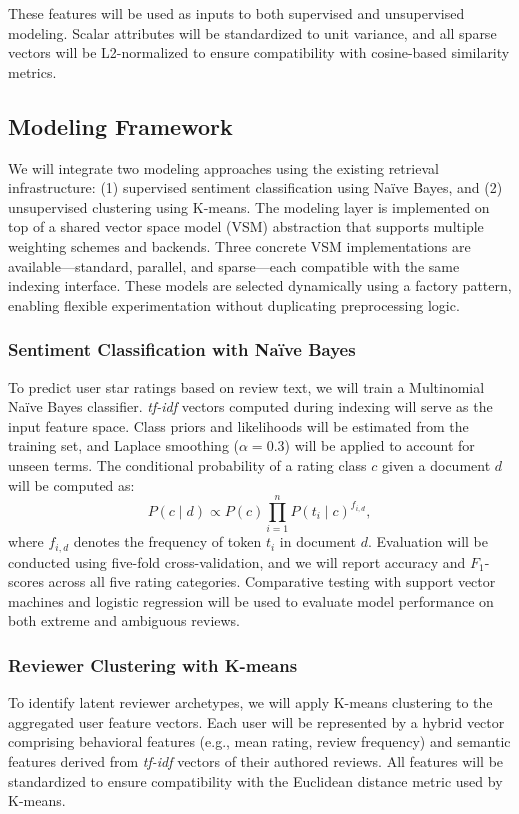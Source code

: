 These features will be used as inputs to both supervised and unsupervised modeling. Scalar attributes will be standardized to unit variance, and all sparse vectors will be L2-normalized to ensure compatibility with cosine-based similarity metrics.

\subsection{Modeling Framework}
We will integrate two modeling approaches using the existing retrieval infrastructure: (1) supervised sentiment classification using Na\"ive Bayes, and (2) unsupervised clustering using K-means. The modeling layer is implemented on top of a shared vector space model (VSM) abstraction that supports multiple weighting schemes and backends. Three concrete VSM implementations are available—standard, parallel, and sparse—each compatible with the same indexing interface. These models are selected dynamically using a factory pattern, enabling flexible experimentation without duplicating preprocessing logic.

\subsubsection{Sentiment Classification with Na\"ive Bayes}
To predict user star ratings based on review text, we will train a Multinomial Na\"ive Bayes classifier. \textit{tf-idf} vectors computed during indexing will serve as the input feature space. Class priors and likelihoods will be estimated from the training set, and Laplace smoothing (\( \alpha = 0.3 \)) will be applied to account for unseen terms. The conditional probability of a rating class \( c \) given a document \( d \) will be computed as:
\[
P(c \mid d) \propto P(c) \prod_{i=1}^{n} P(t_i \mid c)^{f_{i,d}},
\]
where \( f_{i,d} \) denotes the frequency of token \( t_i \) in document \( d \). Evaluation will be conducted using five-fold cross-validation, and we will report accuracy and \(F_1\)-scores across all five rating categories. Comparative testing with support vector machines and logistic regression will be used to evaluate model performance on both extreme and ambiguous reviews.

\subsubsection{Reviewer Clustering with K-means}
To identify latent reviewer archetypes, we will apply K-means clustering to the aggregated user feature vectors. Each user will be represented by a hybrid vector comprising behavioral features (e.g., mean rating, review frequency) and semantic features derived from \textit{tf-idf} vectors of their authored reviews. All features will be standardized to ensure compatibility with the Euclidean distance metric used by K-means.

